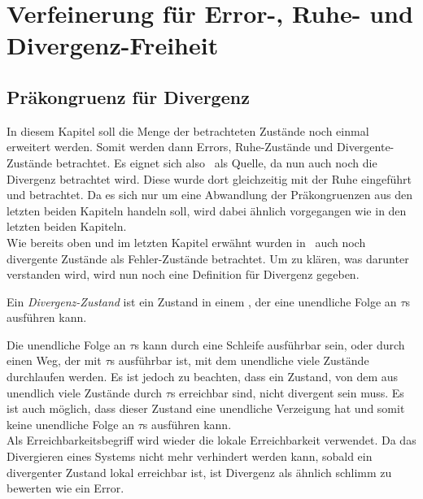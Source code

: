 \chapter{Verfeinerung für Error-, Ruhe- und Divergenz-Freiheit}

\section{Präkongruenz für Divergenz}

In diesem Kapitel soll die Menge der betrachteten Zustände noch einmal
erweitert werden. Somit werden dann Errors, Ruhe-Zustände und
Divergente-Zustände betrachtet. Es eignet sich also~\cite{Chilton2013} als
Quelle, da nun auch noch die Divergenz betrachtet wird. Diese wurde dort
gleichzeitig mit der Ruhe eingeführt und betrachtet. Da es sich nur um eine
Abwandlung der Präkongruenzen aus den letzten beiden Kapiteln handeln soll, wird
dabei ähnlich vorgegangen wie in den letzten beiden Kapiteln.\\
Wie bereits oben und im letzten Kapitel erwähnt wurden in~\cite{Chilton2013}
auch noch divergente Zustände als Fehler-Zustände betrachtet. Um zu klären, was
darunter verstanden wird, wird nun noch eine Definition für Divergenz gegeben.

\begin{Def}[Divergenz]
  Ein \emph{Divergenz-Zustand} ist ein Zustand in einem \EIO{}, der eine
  unendliche Folge an $\tau$s ausführen kann.%
\end{Def}

Die unendliche Folge an $\tau$s kann durch eine Schleife ausführbar sein, oder
durch einen Weg, der mit $\tau$s ausführbar ist, mit dem
unendliche viele Zustände durchlaufen werden. Es ist jedoch zu beachten, dass
ein Zustand, von dem aus unendlich viele Zustände durch $\tau$s erreichbar sind,
nicht divergent sein muss. Es ist auch möglich, dass dieser Zustand eine
unendliche Verzeigung hat und somit keine unendliche Folge an $\tau$s ausführen
kann.\\
Als Erreichbarkeitsbegriff wird wieder die lokale Erreichbarkeit verwendet.
Da das Divergieren eines Systems nicht mehr verhindert werden kann, sobald ein
divergenter Zustand lokal erreichbar ist, ist Divergenz als ähnlich
\glqq{}schlimm\grqq{} zu bewerten wie ein Error.

